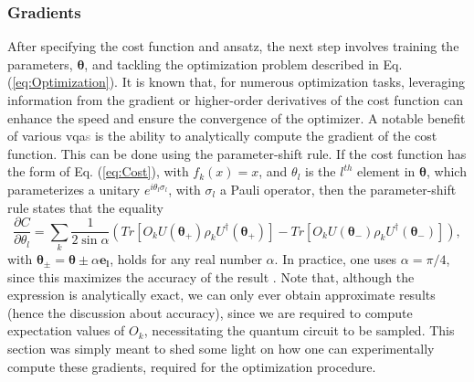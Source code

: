 \subsubsection*{\small Gradients}
After specifying the cost function and ansatz, the next step involves training the parameters, $\boldsymbol{\theta}$, and tackling the optimization problem described in Eq. (\ref{eq:Optimization}). It is known that, for numerous optimization tasks, leveraging information from the gradient or higher-order derivatives of the cost function can enhance the speed and ensure the convergence of the optimizer. A notable benefit of various \acrshort{vqa}\textcolor{gray}{s} is the ability to analytically compute the gradient of the cost function. This can be done using the parameter-shift rule. If the cost function has the form of Eq. (\ref{eq:Cost}), with $f_k(x) = x$, and $\theta_l$ is the $l^{th}$ element in $\boldsymbol{\theta}$, which parameterizes a unitary $e^{i\theta_l \sigma_l}$, with $\sigma_l$ a Pauli operator, then the parameter-shift rule states that the equality
\begin{equation}
    \frac{\partial C}{\partial \theta_l} = \sum_k \frac{1}{2\sin{\alpha}}\left(Tr\left[O_k U(\boldsymbol{\theta_+}) \rho_k U^{\dagger}(\boldsymbol{\theta_+})\right] - Tr\left[O_k U(\boldsymbol{\theta_-}) \rho_k U^{\dagger}(\boldsymbol{\theta_-})\right]\right),
\end{equation}
with $\boldsymbol{\theta_{\pm}} = \boldsymbol{\theta} \pm \alpha \boldsymbol{e_l}$, holds for any real number $\alpha$. In practice, one uses $\alpha = \pi/4$, since this maximizes the accuracy of the result \cite{Cerezo_2021}. Note that, although the expression is analytically exact, we can only ever obtain approximate results (hence the discussion about accuracy), since we are required to compute expectation values of $O_k$, necessitating the quantum circuit to be sampled. This section was simply meant to shed some light on how one can experimentally compute these gradients, required for the optimization procedure.

